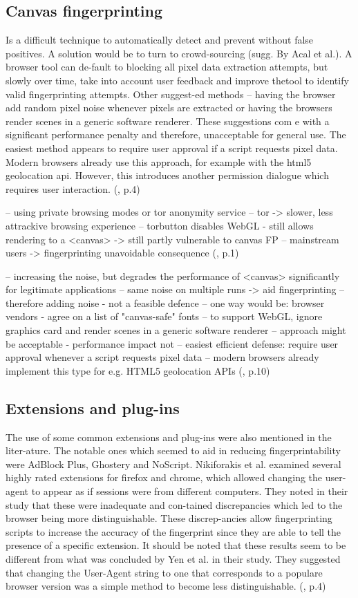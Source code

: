 \subsection{Canvas fingerprinting}
Is a difficult technique to automatically detect and prevent without false positives. A solution would be to turn to crowd-sourcing (sugg. By Acal et al.). A browser tool can de-fault to blocking all pixel data extraction attempts, but slowly over time, take into account user feedback and improve thetool to identify valid fingerprinting attempts. Other suggest-ed methods – having the browser add random pixel noise whenever pixels are extracted or having the browsers render scenes in a generic software renderer. These suggestions com e with a significant performance penalty and therefore, unacceptable for general use. The easiest method appears to require user approval if a script requests pixel data. Modern browsers already use this approach, for example with the html5 geolocation api. However, this introduces another permission dialogue which requires user interaction.
(\textcite{upi15}, p.4)

-- using private browsing modes or tor anonymity service
-- tor -> slower, less attrackive browsing experience
-- torbutton disables WebGL - still allows rendering to a <canvas> -> still partly vulnerable to canvas FP
-- mainstream users -> fingerprinting unavoidable consequence
(\textcite{mowery12}, p.1)


-- increasing the noise, but degrades the performance of <canvas> significantly for legitimate applications
-- same noise on multiple runs -> aid fingerprinting
-- therefore adding noise - not a feasible defence
-- one way would be: browser vendors - agree on a list of "canvas-safe" fonts
-- to support WebGL, ignore graphics card and render scenes in a generic software renderer
-- approach might be acceptable - performance impact not
-- easiest efficient defense: require user approval whenever a script requests pixel data 
-- modern browsers already implement this type for e.g. HTML5 geolocation APIs
(\textcite{mowery12}, p.10)

\subsection{Extensions and plug-ins}
The use of some common extensions and plug-ins were also mentioned in the liter-ature. The notable ones which seemed to aid in reducing fingerprintability were AdBlock Plus, Ghostery and NoScript. Nikiforakis et al. examined several highly rated extensions for firefox and chrome, which allowed changing the user-agent to appear as if sessions were from different computers. They noted in their study that these were inadequate and con-tained discrepancies which led to the browser being more distinguishable. These discrep-ancies allow fingerprinting scripts to increase the accuracy of the fingerprint since they are able to tell the presence of a specific extension. It should be noted that these results seem to be different from what was concluded by Yen et al. in their study. They suggested that changing the User-Agent string to one that corresponds to a populare browser version was a simple method to become less distinguishable. 
(\textcite{upi15}, p.4)


